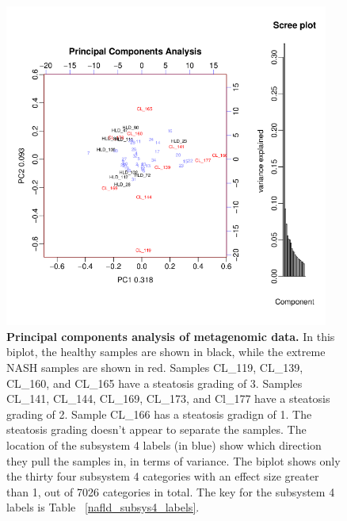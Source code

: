 \begin{figure}[h]
\begin{center}
\includegraphics[width=0.95\textwidth]{metagenomic_pca.png}
\caption[Principal components analysis of metagenomic data.]{\textbf{Principal components analysis of metagenomic data.} In this biplot, the healthy samples are shown in black, while the extreme NASH samples are shown in red. Samples CL\_119, CL\_139, CL\_160, and CL\_165 have a steatosis grading of 3. Samples CL\_141, CL\_144, CL\_169, CL\_173, and Cl\_177 have a steatosis grading of 2. Sample CL\_166 has a steatosis gradign of 1. The steatosis grading doesn't appear to separate the samples. The location of the subsystem 4 labels (in blue) show which direction they pull the samples in, in terms of variance. The biplot shows only the thirty four subsystem 4 categories with an effect size greater than 1, out of 7026 categories in total. The key for the subsystem 4 labels is Table ~\ref{nafld_subsys4_labels}.}
\label{nafld_metagenomic_pca}
\end{center}
\end{figure}

